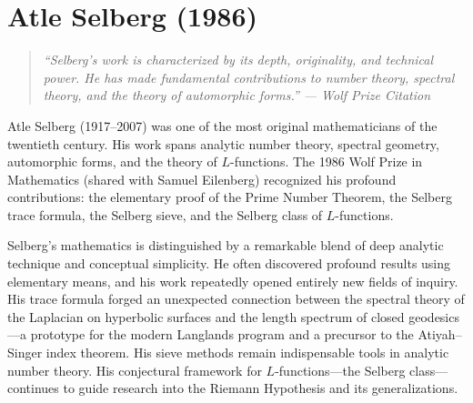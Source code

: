 \let\im\relax
\newcommand{\im}{\operatorname{im}}
\let\SL\relax
\newcommand{\SL}{\operatorname{SL}}
\let\GL\relax
\newcommand{\GL}{\operatorname{GL}}
\let\PSL\relax
\newcommand{\PSL}{\operatorname{PSL}}
\let\ResSel\relax
\newcommand{\ResSel}{\operatorname{Res}}
\let\vol\relax
\newcommand{\vol}{\operatorname{vol}}
\let\area\relax
\newcommand{\area}{\operatorname{area}}
\let\N\relax
\newcommand{\N}{\mathbb{N}}
\let\R\relax
\newcommand{\R}{\mathbb{R}}
\let\C\relax
\newcommand{\C}{\mathbb{C}}
\let\Q\relax
\newcommand{\Q}{\mathbb{Q}}
\let\Z\relax
\newcommand{\Z}{\mathbb{Z}}
\let\HH\relax
\newcommand{\HH}{\mathbb{H}}
\let\cL\relax
\newcommand{\cL}{\mathcal{L}}
\let\cS\relax
\newcommand{\cS}{\mathcal{S}}

\chapter{Atle Selberg (1986)}

\begin{quote}
\it ``Selberg's work is characterized by its depth, originality, and technical power. He has made fundamental contributions to number theory, spectral theory, and the theory of automorphic forms.'' --- Wolf Prize Citation
\end{quote}

Atle Selberg (1917--2007) was one of the most original mathematicians of the twentieth century. His work spans analytic number theory, spectral geometry, automorphic forms, and the theory of \(L\)-functions. The 1986 Wolf Prize in Mathematics (shared with Samuel Eilenberg) recognized his profound contributions: the elementary proof of the Prime Number Theorem, the Selberg trace formula, the Selberg sieve, and the Selberg class of \(L\)-functions.

Selberg's mathematics is distinguished by a remarkable blend of deep analytic technique and conceptual simplicity. He often discovered profound results using elementary means, and his work repeatedly opened entirely new fields of inquiry. His trace formula forged an unexpected connection between the spectral theory of the Laplacian on hyperbolic surfaces and the length spectrum of closed geodesics---a prototype for the modern Langlands program and a precursor to the Atiyah--Singer index theorem. His sieve methods remain indispensable tools in analytic number theory. His conjectural framework for \(L\)-functions---the Selberg class---continues to guide research into the Riemann Hypothesis and its generalizations.

